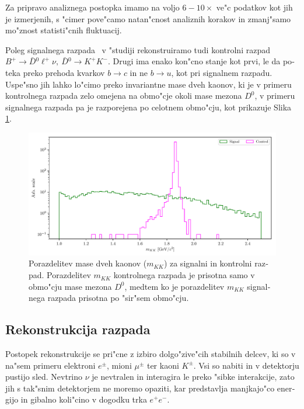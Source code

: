 \begin{otherlanguage}{slovene}
Za pripravo analiznega postopka imamo na voljo $6-10\times$ ve"c podatkov kot jih je izmerjenih, s "cimer pove"camo natan"cnost analiznih korakov in zmanj"samo mo"znost statisti"cnih fluktuacij.

Poleg signalnega razpada \decayb~v "studiji rekonstruiramo tudi kontrolni razpad $B^+ \to \bar D {}^0 \ell^+ \nu,~\bar D{}^0 \to K^+K^-$. Drugi ima enako kon"cno stanje kot prvi, le da poteka preko prehoda kvarkov $b \to c$ in ne $b \to u$, kot pri signalnem razpadu. Uspe"sno jih lahko lo"cimo preko invariantne mase dveh kaonov, ki je v primeru kontrolnega razpada zelo omejena na obmo"cje okoli mase mezona $D^0$, v primeru signalnega razpada pa je razporejena po celotnem obmo"cju, kot prikazuje Slika \ref{fig:mKK_si}.

\begin{figure}[H]
	\centering
	\captionsetup{width=0.8\linewidth}
	\includegraphics[width=\linewidth]{fig/mKK_si}
	\caption{Porazdelitev mase dveh kaonov ($m_{KK}$) za signalni in kontrolni razpad. Porazdelitev $m_{KK}$ kontrolnega razpada je prisotna samo v obmo"cju mase mezona $D^0$, medtem ko je porazdelitev $m_{KK}$ signalnega razpada prisotna po "sir"sem obmo"cju.}
	\label{fig:mKK_si}
\end{figure}

\subsection{Rekonstrukcija razpada}\label{sec:rekonstrukcija-razpada}

Postopek rekonstrukcije se pri"cne z izbiro dolgo"zive"cih stabilnih delcev, ki so v na"sem primeru elektroni $e^\pm$, mioni $\mu^\pm$ ter kaoni $K^\pm$. Vsi so nabiti in v detektorju pustijo sled. Nevtrino $\nu$ je nevtralen in interagira le preko "sibke interakcije, zato jih s tak"snim detektorjem ne moremo opaziti, kar predstavlja manjkajo"co energijo in gibalno koli"cino v dogodku trka $e^+e^-$.


\end{otherlanguage}
